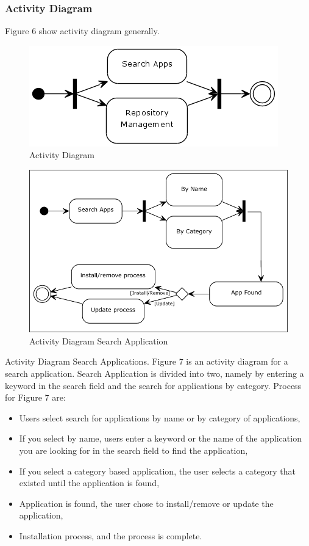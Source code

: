 \documentclass[conference, letterpaper]{IEEEtran}
\begin{document}
\subsubsection{Activity Diagram}
Figure 6 show activity diagram generally.

\begin{figure}[!t]
\centering
\includegraphics[scale=0.7]{image/ActivityDiagram.png}
\caption{Activity Diagram}
\end{figure}

\begin{figure}[!t]
\centering
\includegraphics[scale=0.5]{image/ADSearchApp.png}
\caption{Activity Diagram Search Application}
\end{figure}

Activity Diagram Search Applications. Figure 7 is an activity diagram for a search application. Search Application is divided into two, namely by entering a keyword in the search field and the search for applications by category. Process for Figure 7 are:
\begin{itemize}
\item Users select search for applications by name or by category of applications,
\item If you select by name, users enter a keyword or the name of the application you are looking for in the search field to find the application,
\item If you select a category based application, the user selects a category that existed until the application is found,
\item Application is found, the user chose to install/remove or update the application,
\item Installation process, and the process is complete.
\end{itemize}
\end{document}
